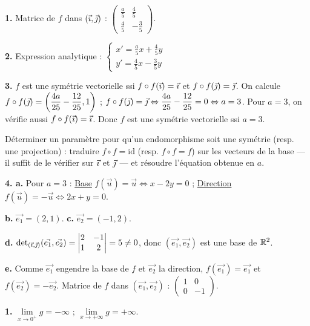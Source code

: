 \documentclass[11pt]{article}
\begin{document}
\textbf{1.} Matrice de $f$ dans $(\vec{\imath},\vec{\jmath})$ : $\begin{pmatrix} \frac{a}{5} & \frac{4}{5} \\[2pt] \frac{4}{5} & -\frac{3}{5} \end{pmatrix}$.

\textbf{2.} Expression analytique : $\begin{cases} x' = \frac{a}{5}x + \frac{4}{5}y \\[2pt] y' = \frac{4}{5}x - \frac{3}{5}y \end{cases}$

\textbf{3.} $f$ est une symétrie vectorielle ssi $f\circ f(\vec{\imath}) = \vec{\imath}$ et $f\circ f(\vec{\jmath}) = \vec{\jmath}$. On calcule $f\circ f(\vec{\jmath}) = \left(\dfrac{4a}{25} - \dfrac{12}{25}, 1\right)$ ; $f\circ f(\vec{\jmath}) = \vec{\jmath} \Leftrightarrow \dfrac{4a}{25} - \dfrac{12}{25} = 0 \Leftrightarrow a = 3$. Pour $a = 3$, on vérifie aussi $f\circ f(\vec{\imath}) = \vec{\imath}$. Donc $f$ est une symétrie vectorielle ssi $a = 3$.

\begin{methode}
Déterminer un paramètre pour qu'un endomorphisme soit une symétrie
(resp. une projection) : traduire $f \circ f = \mathrm{id}$ (resp.
$f \circ f = f$) sur les vecteurs de la base — il suffit de le vérifier
sur $\vec{\imath}$ et $\vec{\jmath}$ — et résoudre l'équation obtenue en $a$.
\end{methode}

\textbf{4. a.} Pour $a = 3$ : \underline{Base} $f(\vec{u}) = \vec{u} \Leftrightarrow x - 2y = 0$ ; \underline{Direction} $f(\vec{u}) = -\vec{u} \Leftrightarrow 2x + y = 0$.

\textbf{b.} $\vec{e_1} = (2, 1)$. \quad \textbf{c.} $\vec{e_2} = (-1, 2)$.

\textbf{d.} $\det_{(\vec{\imath},\vec{\jmath})}(\vec{e_1}, \vec{e_2}) = \begin{vmatrix} 2 & -1 \\ 1 & 2 \end{vmatrix} = 5 \ne 0$, donc $(\vec{e_1}, \vec{e_2})$ est une base de $\mathbb{R}^2$.

\textbf{e.} Comme $\vec{e_1}$ engendre la base de $f$ et $\vec{e_2}$ la direction, $f(\vec{e_1}) = \vec{e_1}$ et $f(\vec{e_2}) = -\vec{e_2}$. Matrice de $f$ dans $(\vec{e_1}, \vec{e_2})$ : $\begin{pmatrix} 1 & 0 \\ 0 & -1 \end{pmatrix}$.

\textbf{1.} $\lim\limits_{x\to 0^+} g = -\infty$ ; $\lim\limits_{x\to+\infty} g = +\infty$.
\end{document}
